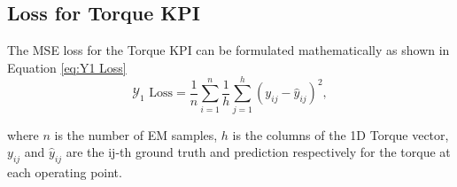 \documentclass{report} %
\begin{document}
\subsection{Loss for Torque KPI}\label{sec:Loss for 2D KPI}

The \ac{MSE} loss for the Torque \ac{KPI} can be formulated mathematically as shown in Equation \ref{eq:Y1 Loss}
\begin{equation}
    \text{$\mathcal{Y}_1$ Loss} = \frac{1}{n} \sum_{i=1}^{n} \frac{1}{h} \sum_{j=1}^{h} (y_{ij} - \hat{y}_{ij})^2,
    \label{eq:Y1 Loss}
\end{equation} 

where \(n\) is the number of \ac{EM} samples, \(h\) is the columns of the 1D Torque vector, \(y_{ij}\) and $\hat{y}_{ij}$ are the ij-th ground truth and prediction 
respectively for the torque at each operating point.\\
\end{document}
